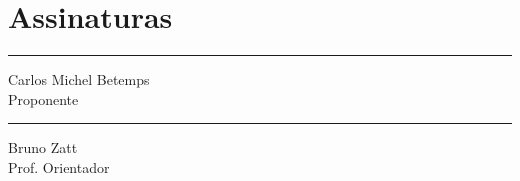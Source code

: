 \documentclass[tese-proposta,nocipinfo]{texufpel}
\begin{document}

\chapter{Assinaturas}
\vspace{2cm}

\begin{center}
\rule{8cm}{.3mm}
\medskip

	Carlos Michel Betemps\\
	Proponente

\end{center}

\vspace{4cm}

\begin{center}
\rule{8cm}{.3mm}
\medskip

	Bruno Zatt\\
	Prof. Orientador

\end{center}
\end{document}
